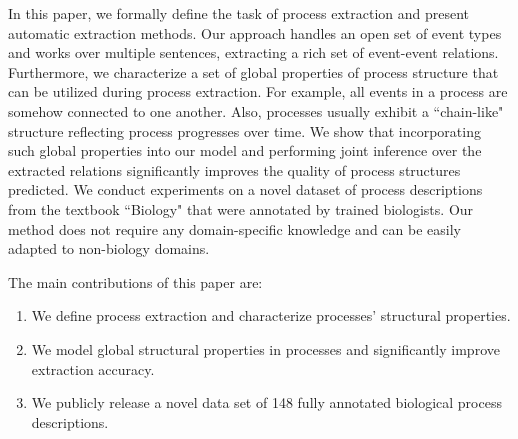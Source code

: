 
In this paper, we formally define the task of process extraction and present automatic extraction methods. 
Our approach handles an open set of event types and works over multiple sentences, extracting a rich set of event-event relations.
Furthermore, we characterize a set of global properties of process structure that can be utilized during process extraction. 
For example, all events in a process are somehow connected to one another. Also, processes usually exhibit a ``chain-like" structure reflecting process progresses over time. 
We show that incorporating such global properties into our model and performing joint inference over the extracted relations significantly improves the quality of process structures predicted.  
We conduct experiments on a novel dataset of process descriptions from the textbook ``Biology" \cite{CampbellReece} that were annotated by trained biologists. Our method does not require any domain-specific knowledge and can be easily adapted to non-biology domains.

The main contributions of this paper are:
\begin{enumerate}[itemsep=0pt,topsep=0pt] 
\item We define process extraction and characterize processes' structural properties.
\item We model global structural properties in processes and significantly improve extraction accuracy.
\item We publicly release a novel data set of 148 fully annotated biological process descriptions.
\end{enumerate}
